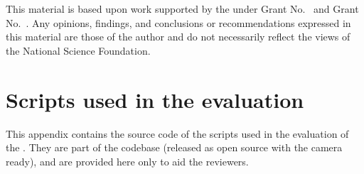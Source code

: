 \documentclass[sigplan,10pt,review,anonymous]{acmart}
\begin{document}
\begin{acks}
  This material is based upon work supported by the
   under Grant
  No.~ and Grant
  No.~.  Any opinions, findings, and
  conclusions or recommendations expressed in this material are those
  of the author and do not necessarily reflect the views of the
  National Science Foundation.
\end{acks}





\appendix
\section{Scripts used in the evaluation}

This appendix contains the source code of the scripts used in the evaluation of
the \sys. They are part of the codebase (released as open source with the camera
ready), and are provided here only to aid the reviewers.
\end{document}
